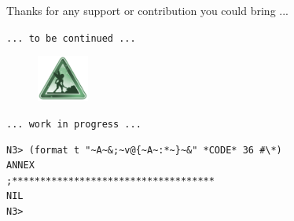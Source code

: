 \documentclass{article}
\begin{document}
\bigskip

Thanks for any support or contribution you could bring ...

\bigskip 
\bigskip

\centerline{\texttt{{\footnotesize ... to be continued ...}}}
\begin{figure}[htbp]
\begin{center}
\includegraphics[width=1.7cm]{2223}
\end{center}
\end{figure}
\vspace{-5mm}
\centerline{\texttt{{\footnotesize ... work in progress ...}}}

\bigskip
\bigskip

\begin{lstlisting}[language=sectitle]
N3> (format t "~A~&;~v@{~A~:*~}~&" *CODE* 36 #\*)
ANNEX
;************************************
NIL
N3> 
\end{lstlisting}

\end{document}
